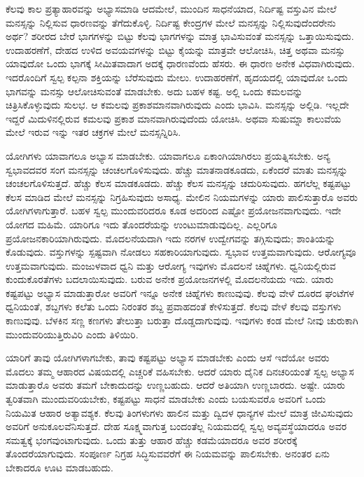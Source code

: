 ಕೆಲವು ಕಾಲ ಪ್ರತ್ಯಾಹಾರವನ್ನು ಅಭ್ಯಾಸಮಾಡಿ ಆದಮೇಲೆ, ಮುಂದಿನ ಸಾಧನೆಯಾದ, ನಿರ್ದಿಷ್ಟ ವಸ್ತುವಿನ ಮೇಲೆ ಮನಸ್ಸನ್ನು ನಿಲ್ಲಿಸುವ ಧಾರಣವನ್ನು ತೆಗೆದುಕೊಳ್ಳಿ. ನಿರ್ದಿಷ್ಟ ಕೇಂದ್ರಗಳ ಮೇಲೆ ಮನಸ್ಸನ್ನು ನಿಲ್ಲಿಸುವುದೆಂದರೇನು ಅರ್ಥ? ಶರೀರದ ಬೇರೆ ಭಾಗಗಳನ್ನು ಬಿಟ್ಟು ಕೆಲವು ಭಾಗಗಳನ್ನು ಮಾತ್ರ ಭಾವಿಸುವಂತೆ ಮನಸ್ಸನ್ನು ಒತ್ತಾಯಿಸುವುದು. ಉದಾಹರಣೆಗೆ, ದೇಹದ ಉಳಿದ ಅವಯವಗಳನ್ನು ಬಿಟ್ಟು ಕೈಯನ್ನು ಮಾತ್ರವೇ ಆಲೋಚಿಸಿ, ಚಿತ್ತ ಅಥವಾ ಮನಸ್ಸು ಯಾವುದೋ ಒಂದು ಭಾಗಕ್ಕೆ ಸೀಮಿತವಾದಾಗ ಅದಕ್ಕೆ ಧಾರಣವೆಂದು ಹೆಸರು. ಈ ಧಾರಣ ಅನೇಕ ವಿಧವಾಗಿರುವುದು. ಇದರೊಂದಿಗೆ ಸ್ವಲ್ಪ ಕಲ್ಪನಾ ಶಕ್ತಿಯನ್ನು ಬೆರೆಸುವುದು ಮೇಲು. ಉದಾಹರಣೆಗೆ, ಹೃದಯದಲ್ಲಿ ಯಾವುದೋ ಒಂದು ಭಾಗವನ್ನು ಮನಸ್ಸು ಆಲೋಚಿಸುವಂತೆ ಮಾಡಬೇಕು. ಅದು ಬಹಳ ಕಷ್ಟ. ಅಲ್ಲಿ ಒಂದು ಕಮಲವನ್ನು ಚಿತ್ರಿಸಿಕೊಳ್ಳುವುದು ಸುಲಭ. ಆ ಕಮಲವು ಪ್ರಕಾಶಮಾನವಾಗಿರುವುದು ಎಂದು ಭಾವಿಸಿ. ಮನಸ್ಸನ್ನು ಅಲ್ಲಿಡಿ. ಇಲ್ಲದೇ ಇದ್ದರೆ ಮಿದುಳಿನಲ್ಲಿರುವ ಕಮಲವು ಪ್ರಕಾಶ ಮಾನವಾಗಿರುವುದೆಂದು ಯೋಚಿಸಿ. ಅಥವಾ ಸುಷುಮ್ನಾ ಕಾಲುವೆಯ ಮೇಲೆ ಇರುವ ಇನ್ನು ಇತರ ಚಕ್ರಗಳ ಮೇಲೆ ಮನಸ್ಸನ್ನಿರಿಸಿ. 

ಯೋಗಿಗಳು ಯಾವಾಗಲೂ ಅಭ್ಯಾಸ ಮಾಡಬೇಕು. ಯಾವಾಗಲೂ ಏಕಾಂಗಿಯಾಗಿ\break ರಲು ಪ್ರಯತ್ನಿಸಬೇಕು. ಅನ್ಯ ಸ್ವಭಾವದವರ ಸಂಗ ಮನಸ್ಸನ್ನು ಚಂಚಲಗೊಳಿಸುವುದು. ಹೆಚ್ಚು ಮಾತನಾಡಕೂಡದು, ಏಕೆಂದರೆ ಮಾತು ಮನಸ್ಸನ್ನು ಚಂಚಲಗೊಳಿಸುತ್ತದೆ. ಹೆಚ್ಚು ಕೆಲಸ ಮಾಡಕೂಡದು. ಹೆಚ್ಚು ಕೆಲಸ ಮನಸ್ಸನ್ನು ಚದುರಿಸುವುದು. ಹಗಲೆಲ್ಲ ಕಷ್ಟಪಟ್ಟು ಕೆಲಸ ಮಾಡಿದ ಮೇಲೆ ಮನಸ್ಸನ್ನು ನಿಗ್ರಹಿಸುವುದು ಅಸಾಧ್ಯ. ಮೇಲಿನ ನಿಯಮಗಳನ್ನು ಯಾರು ಪಾಲಿಸುತ್ತಾರೊ ಅವರು ಯೋಗಿಗಳಾಗುತ್ತಾರೆ. ಬಹಳ ಸ್ವಲ್ಪ ಮುಂದುವರಿದರೂ ಕೂಡ ಅದರಿಂದ ಎಷ್ಟೋ ಪ್ರಯೋಜನವಾಗುವುದು. ಇದೇ ಯೋಗದ ಮಹಿಮೆ. ಯಾರಿಗೂ ಇದು ತೊಂದರೆಯನ್ನು ಉಂಟುಮಾಡುವುದಿಲ್ಲ. ಎಲ್ಲರಿಗೂ ಪ್ರಯೋಜನಕಾರಿಯಾಗಿರುವುದು. ಮೊದಲನೆಯದಾಗಿ ಇದು ನರಗಳ ಉದ್ವೇಗವನ್ನು ತಗ್ಗಿಸುವುದು; ಶಾಂತಿಯನ್ನು ಕೊಡುವುದು. ವಸ್ತುಗಳನ್ನು ಸ್ಪಷ್ಟವಾಗಿ ನೋಡಲು ಸಹಕಾರಿಯಾಗುವುದು. ಸ್ವಭಾವ ಉತ್ತಮವಾಗುವುದು. ಆರೋಗ್ಯವೂ ಉತ್ತಮವಾಗುವುದು. ಮಂಜುಳವಾದ ಧ್ವನಿ ಮತ್ತು ಆರೋಗ್ಯ ಇವುಗಳು ಮೊದಲನೆ ಚಿಹ್ನೆಗಳು. ಧ್ವನಿಯಲ್ಲಿರುವ ಕುಂದುಕೊರತೆಗಳು ಬದಲಾಯಿಸುವುದು. ಬರುವ ಅನೇಕ ಪ್ರಯೋಜನಗಳಲ್ಲಿ ಮೊದಲನೆಯದು ಇದು. ಯಾರು ಕಷ್ಟಪಟ್ಟು ಅಭ್ಯಾಸ ಮಾಡುತ್ತಾರೋ ಅವರಿಗೆ ಇನ್ನೂ ಅನೇಕ ಚಿಹ್ನೆಗಳು ಕಾಣುವುವು. ಕೆಲವು ವೇಳೆ ದೂರದ ಘಂಟೆಗಳ ಧ್ವನಿಯಂತೆ, ಶಬ್ದಗಳು ಕಲೆತು ಒಂದು ನಿರಂತರ ಶಬ್ದ ಪ್ರವಾಹದಂತೆ ಕೇಳಿಸುತ್ತದೆ. ಕೆಲವು ವೇಳೆ ಕೆಲವು ವಸ್ತುಗಳು ಕಾಣುವುವು. ಬೆಳಕಿನ ಸಣ್ಣ ಕಣಗಳು ತೇಲುತ್ತಾ ಬರುತ್ತಾ ದೊಡ್ಡದಾಗುವುವು. ಇವುಗಳು ಕಂಡ ಮೇಲೆ ನೀವು ಚುರುಕಾಗಿ ಮುಂದುವರಿಯುತ್ತಿರುವಿರಿ ಎಂದು ತಿಳಿಯಿರಿ. 

ಯಾರಿಗೆ ತಾವು ಯೋಗಿಗಳಾಗಬೇಕು, ತಾವು ಕಷ್ಟಪಟ್ಟು ಅಭ್ಯಾಸ ಮಾಡಬೇಕು ಎಂದು ಆಸೆ ಇದೆಯೋ ಅವರು ಮೊದಲು ತಮ್ಮ ಆಹಾರದ ವಿಷಯದಲ್ಲಿ ಎಚ್ಚರಿಕೆ ವಹಿಸ\break ಬೇಕು. ಆದರೆ ಯಾರು ದೈನಿಕ ದಿನಚರಿಯಂತೆ ಸ್ವಲ್ಪ ಅಭ್ಯಾಸ ಮಾಡುತ್ತಾರೊ ಅವರು ತಮಗೆ ಬೇಕಾದುದನ್ನು ಉಣ್ಣಬಹುದು. ಆದರೆ ಅತಿಯಾಗಿ ಉಣ್ಣಬಾರದು. ಅಷ್ಟೇ. ಯಾರು ತ್ವರಿತವಾಗಿ ಮುಂದುವರಿಯಬೇಕು, ಕಷ್ಟಪಟ್ಟು ಸಾಧನೆ ಮಾಡಬೇಕು ಎಂದು ಬಯಸುವರೊ ಅವರಿಗೆ ಒಂದು ನಿಯಮಿತ ಆಹಾರ ಅತ್ಯಾವಶ್ಯಕ. ಕೆಲವು ತಿಂಗಳುಗಳು ಹಾಲಿನ ಮತ್ತು ದ್ವಿದಳ ಧಾನ್ಯಗಳ ಮೇಲೆ ಮಾತ್ರ ಜೀವಿಸುವುದು ಅವರಿಗೆ ಅನುಕೂಲವೆನಿಸುತ್ತದೆ. ದೇಹ ಸೂಕ್ಷ್ಮವಾಗುತ್ತ ಬಂದಂತೆಲ್ಲ ನಿಯಮದಲ್ಲಿ ಸ್ವಲ್ಪ ಅವ್ಯವಸ್ಥೆಯಾದರೂ ಅವರ ಸಮತ್ವಕ್ಕೆ ಭಂಗವುಂಟಾಗುವುದು. ಒಂದು ತುತ್ತು ಆಹಾರ ಹೆಚ್ಚು ಕಡಮೆಯಾದರೂ ಅವರ ಶರೀರಕ್ಕೆ ತೊಂದರೆಯಾಗುವುದು. ಸಂಪೂರ್ಣ ನಿಗ್ರಹ ಸಿದ್ಧಿಸುವವರೆಗೆ ಈ ನಿಯಮವನ್ನು ಪಾಲಿಸಬೇಕು. ಅನಂತರ ಏನು ಬೇಕಾದರೂ ಊಟ ಮಾಡಬಹುದು. 

